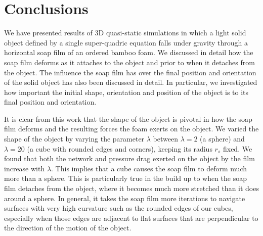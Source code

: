 \documentclass[preprint]{revtex4-1}
\begin{document}
\section{Conclusions}
	\label{sec:conclusions}



We have presented results of 3D quasi-static simulations in which a light solid object defined by a single super-quadric equation falls under gravity through a horizontal soap film of an ordered bamboo foam. We discussed in detail how the soap film deforms as it attaches to the object and prior to when it detaches from the object. The influence the soap film has over the final position and orientation of the solid object has also been discussed in detail. In particular, we investigated how important the initial shape, orientation and position of the object is to its final position and orientation. 


It is clear from this work that the shape of the object is pivotal in how the soap film deforms and the resulting forces the foam exerts on the object. We varied the shape of the object by varying the parameter $\lambda$ between $\lambda=2$ (a sphere) and $\lambda=20$ (a cube with rounded edges and corners), keeping its radius $r_s$ fixed. We found that both the network and pressure drag exerted on the object by the film increase with $\lambda$. This implies that a cube causes the soap film to deform much more than a sphere. This is particularly true in the build up to when the soap film detaches from the object, where it becomes much more stretched than it does around a sphere. In general, it takes the soap film more iterations to navigate surfaces with very high curvature such as the rounded edges of our cubes, especially when those edges are adjacent to flat surfaces that are perpendicular to the direction of the motion of the object.
\end{document}
